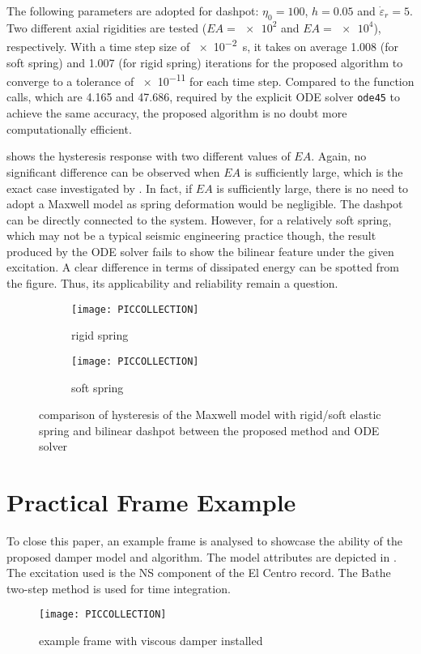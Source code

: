 The following parameters are adopted for dashpot: $\eta_0=100$, $h=0.05$ and $\dot\varepsilon_r=5$. Two different axial rigidities are tested ($EA=\num[print-unity-mantissa=false]{e2}$ and $EA=\num[print-unity-mantissa=false]{e4}$), respectively. With a time step size of \SI{e-2}{\second}, it takes on average \num{1.008} (for soft spring) and \num{1.007} (for rigid spring) iterations for the proposed algorithm to converge to a tolerance of \num[print-unity-mantissa=false]{e-11} for each time step. Compared to the function calls, which are \num{4.165} and \num{47.686}, required by the explicit ODE solver \texttt{ode45} to achieve the same accuracy, the proposed algorithm is no doubt more computationally efficient.

 shows the hysteresis response with two different values of $EA$. Again, no significant difference can be observed when $EA$ is sufficiently large, which is the exact case investigated by \citet{Akcelyan2018}. In fact, if $EA$ is sufficiently large, there is no need to adopt a Maxwell model as spring deformation would be negligible. The dashpot can be directly connected to the system. However, for a relatively soft spring, which may not be a typical seismic engineering practice though, the result produced by the ODE solver fails to show the bilinear feature under the given excitation. A clear difference in terms of dissipated energy can be spotted from the figure. Thus, its applicability and reliability remain a question.
\begin{figure}[ht]
\centering\scriptsize
\begin{subfigure}{.49\textwidth}\centering
\texttt{[image: PICCOLLECTION]}
\caption{rigid spring}
\end{subfigure}\hfill
\begin{subfigure}{.49\textwidth}\centering
\texttt{[image: PICCOLLECTION]}
\caption{soft spring}
\end{subfigure}
\caption{comparison of hysteresis of the Maxwell model with rigid/soft elastic spring and bilinear dashpot between the proposed method and ODE solver}\label{fig:bilinear_dashpot}
\end{figure}
\section{Practical Frame Example}
To close this paper, an example frame is analysed to showcase the ability of the proposed damper model and algorithm. The model attributes are depicted in . The excitation used is the NS component of the El Centro record. The Bathe two-step method \citep{Bathe2007} is used for time integration.
\begin{figure}[ht]
\centering\scriptsize
\texttt{[image: PICCOLLECTION]}
\caption{example frame with viscous damper installed}\label{fig:frame}
\end{figure}

